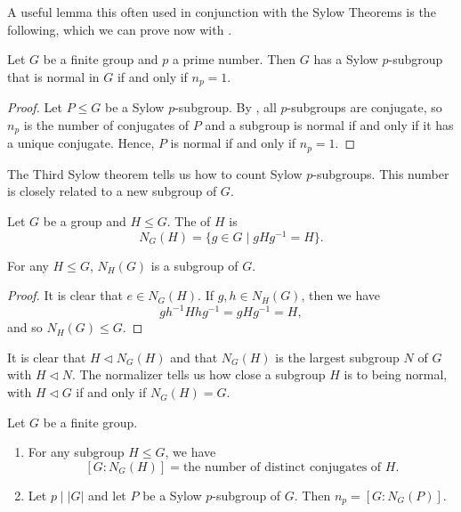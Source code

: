 A useful lemma this often used in conjunction with the Sylow Theorems is the following, which we can prove now with .

\begin{lemma}\label{lem:group-theory:p-group-normal-iff-np=1}
  Let \(G\) be a finite group and \(p\) a prime number. Then \(G\) has a Sylow \(p\)-subgroup that is normal in \(G\) if and only if \(n_{p} = 1\).
\end{lemma}

\begin{proof}
  Let \(P \leq G\) be a Sylow \(p\)-subgroup. By , all \(p\)-subgroups are conjugate, so \(n_{p}\) is the number of conjugates of \(P\) and a subgroup is normal if and only if it has a unique conjugate. Hence, \(P\) is normal if and only if \(n_{p} = 1\).
\end{proof}

The Third Sylow theorem tells us how to count Sylow \(p\)-subgroups. This number is closely related to a new subgroup of \(G\).

\begin{definition}\label{def:group-theory:normalizer}
  Let \(G\) be a group and \(H \leq G\). The  of \(H\) is
  \[N_{G}(H) = \{g \in G \mid gHg^{-1} = H\}.\]
\end{definition}

\begin{lemma}
  For any \(H \leq G\), \(N_{H}(G)\) is a subgroup of \(G\).
\end{lemma}

\begin{proof}
  It is clear that \(e \in N_{G}(H)\). If \(g,h \in N_{H}(G)\), then we have
  \[gh^{-1}H hg^{-1} = gHg^{-1} = H,\]
  and so \(N_{H}(G) \leq G\).
\end{proof}

It is clear that \(H \triangleleft N_{G}(H)\) and that \(N_{G}(H)\) is the largest subgroup \(N\) of \(G\) with \(H \triangleleft N\). The normalizer tells us how close a subgroup \(H\) is to being normal, with \(H \triangleleft G\) if and only if \(N_{G}(H) = G\).

\begin{lemma}
  Let \(G\) be a finite group.

  \begin{enumerate}
    \item For any subgroup \(H \leq G\), we have
      \[[G:N_{G}(H)] = \text{the number of distinct conjugates of } H.\]
    \item Let \(p \mid |G|\) and let \(P\) be a Sylow \(p\)-subgroup of \(G\). Then \(n_{p} = [G:N_{G}(P)]\).
    \end{enumerate}
\end{lemma}

